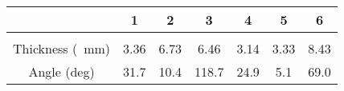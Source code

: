 \documentclass{article}
\begin{document}
    \begin{tabular}{c c c c c c c}
        \toprule
        & 1 & 2 & 3 & 4 & 5 & 6 \\ 
        \midrule\\
        \addlinespace[-2ex]
        Thickness (\SI{}{\milli \meter}) & 3.36 & 6.73 & 6.46 & 3.14 & 3.33 & 8.43  \\
        \addlinespace[1.5ex]
        Angle (deg) & 31.7 & 10.4 & 118.7 & 24.9 & 5.1 & 69.0 \\
        \bottomrule
    \end{tabular}
\end{document}
